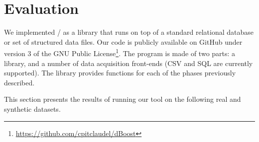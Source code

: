 \section{Evaluation}
\label{sec:evaluation}



We implemented \dBoost/ as a library that runs on top of a standard relational database or set of structured data files. Our code is publicly available on GitHub under version 3 of the GNU Public License\footnote{\url{https://github.com/cpitclaudel/dBoost}}. The program is made of two parts: a library, and a number of data acquisition front-ends (CSV and SQL are currently supported). The library provides functions for each of the phases previously described.



%

This section presents the results of running our tool on the following real and synthetic datasets.

